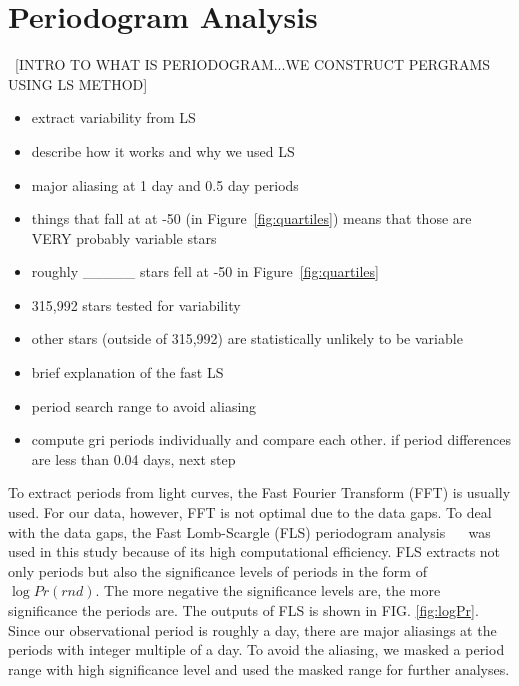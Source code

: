 \documentclass[aps,prb,twocolumn,superscriptaddress]{revtex4-1}
\begin{document}
\section{Periodogram Analysis}\label{sec:PA}

~[INTRO TO WHAT IS PERIODOGRAM...WE CONSTRUCT PERGRAMS USING LS METHOD]
\begin{itemize}
	\item{} extract variability from LS
	\item{} describe how it works and why we used LS
	\item{} major aliasing at 1 day and 0.5 day periods
	\item{} things that fall at at -50 (in Figure~\ref{fig:quartiles}) means that those are VERY probably variable stars
	\item{} roughly \_\_\_\_\_ stars fell at -50 in Figure~\ref{fig:quartiles}
	\item{} 315,992 stars tested for variability
	\item{} other stars (outside of 315,992) are statistically unlikely to be variable
\end{itemize}

\begin{itemize}
	\item{} brief explanation of the fast LS
	\item{} period search range to avoid aliasing
	\item{} compute gri periods individually and compare each other. if period differences are less than 0.04 days, next step
\end{itemize}

To extract periods from light curves, the Fast Fourier Transform (FFT) is usually used. For our data, however, FFT is not optimal due to the data gaps. To deal with the data gaps, the Fast Lomb-Scargle (FLS) periodogram analysis~\citep{Numerical} ~\citep{Gats} was used in this study because of its high computational efficiency. FLS extracts not only periods but also the significance levels of periods in the form of $\log{Pr(rnd)}$. The more negative the significance levels are, the more significance the periods are. The outputs of FLS is shown in FIG. \ref{fig:logPr}. Since our observational period is roughly a day, there are major aliasings at the periods with integer multiple of a day. To avoid the aliasing, we masked a period range with high significance level and used the masked range for further analyses.
\end{document}
